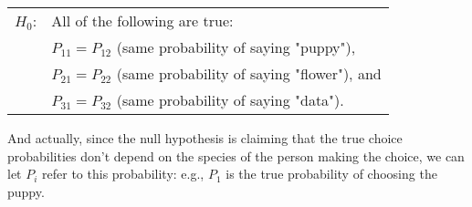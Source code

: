 \smallskip
\begin{tabular}{ll}
$H_0$: \hspace*{0.5cm} & All of the following are true: \\ 
    & $P_{11} = P_{12}$ (same probability of saying "puppy"), \\ 
	& $P_{21} = P_{22}$ (same probability of saying "flower"), and\\ 
	& $P_{31} = P_{32}$ (same probability of saying "data").\\ 
\end{tabular} 
\smallskip


And actually, since the null hypothesis is claiming that the true choice probabilities don't depend on the species of the person making the choice, we can let $P_i$ refer to this probability: e.g., $P_1$ is the true probability of choosing the puppy.

